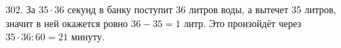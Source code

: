 302. За $35\cdot36$ секунд в банку поступит 36 литров воды, а вытечет 35 литров, значит в ней окажется ровно $36-35=1$ литр. Это произойдёт через $35\cdot36:60=21$ минуту.\\

